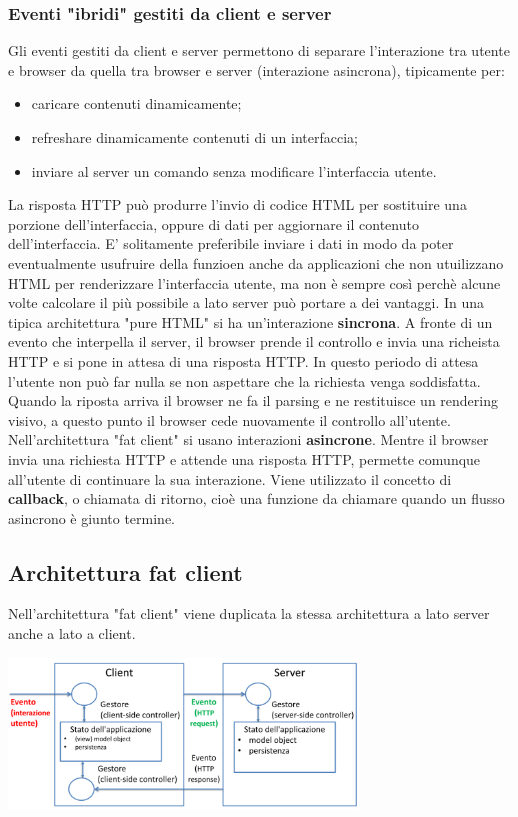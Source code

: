\subsubsection{Eventi "ibridi" gestiti da client e server}
Gli eventi gestiti da client e server permettono di separare l'interazione tra utente e browser da quella tra browser e server (interazione asincrona), tipicamente per:
\begin{itemize}
    \item caricare contenuti dinamicamente;
    \item refreshare dinamicamente contenuti di un interfaccia;
    \item inviare al server un comando senza modificare l'interfaccia utente.
\end{itemize}
La risposta HTTP può produrre l'invio di codice HTML per sostituire una porzione dell'interfaccia, oppure di dati per aggiornare il contenuto dell'interfaccia. E' solitamente preferibile inviare i dati in modo da poter eventualmente usufruire della funzioen anche da applicazioni che non utuilizzano HTML per renderizzare l'interfaccia utente, ma non è sempre così perchè alcune volte calcolare il più possibile a lato server può portare a dei vantaggi.\newline
\newline
In una tipica architettura "pure HTML" si ha un'interazione \textbf{sincrona}. A fronte di un evento che interpella il server, il browser prende il controllo e invia una richeista HTTP e si pone in attesa di una risposta HTTP. In questo periodo di attesa l'utente non può far nulla se non aspettare che la richiesta venga soddisfatta. Quando la riposta arriva il browser ne fa il parsing e ne restituisce un rendering visivo, a questo punto il browser cede nuovamente il controllo all'utente.\newline
\newline
Nell'architettura "fat client" si usano interazioni \textbf{asincrone}. Mentre il browser invia una richiesta HTTP e attende una risposta HTTP, permette comunque all'utente di continuare la sua interazione.\newline
Viene utilizzato il concetto di \textbf{callback}, o chiamata di ritorno, cioè una funzione da chiamare quando un flusso asincrono è giunto termine.\newline
\subsection{Architettura fat client}
Nell'architettura "fat client" viene duplicata la stessa architettura a lato server anche a lato a client.
\begin{center}
    \includegraphics[height=4cm]{../lezione12/img1.PNG}
\end{center}
